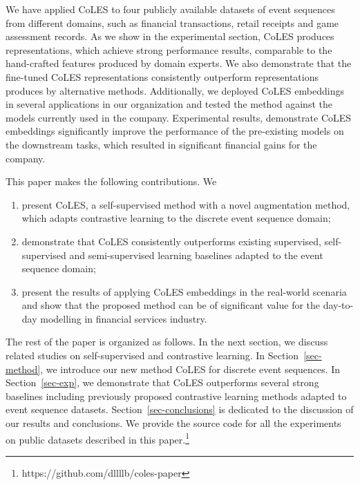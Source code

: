 \documentclass[sigconf]{acmart}
\begin{document}
We have applied CoLES to four publicly available datasets of event sequences from different
domains, such as financial transactions, retail receipts and game assessment records. As we
show in the experimental section, CoLES produces representations, which achieve strong
performance results, comparable to the hand-crafted features produced by domain experts.
We also demonstrate that the fine-tuned CoLES representations consistently outperform
representations produces by alternative methods.
%
%
Additionally, we deployed CoLES embeddings in several applications in our organization and tested
the method against the models currently used in the company. Experimental results, demonstrate
CoLES embeddings significantly improve the performance of the pre-existing models on the downstream
tasks, which resulted in significant financial gains for the company.

This paper makes the following contributions. We
\begin{enumerate}
    \item present CoLES, a self-supervised method with a novel augmentation method, which adapts
    contrastive learning to the discrete event sequence domain;

    \item demonstrate that CoLES consistently outperforms existing supervised, self-supervised and
    semi-supervised learning baselines adapted to the event sequence domain;

    \item present the results of applying CoLES embeddings in the real-world scenaria and show
    that the proposed method can be of significant value for the day-to-day modelling in financial
    services industry.
\end{enumerate}

The rest of the paper is organized as follows. In the next section, we discuss related studies
on self-supervised and contrastive learning. In Section~\ref{sec-method}, we introduce our new
method CoLES for discrete event sequences. In Section~\ref{sec-exp}, we demonstrate that CoLES
outperforms several strong baselines including previously proposed contrastive learning methods
adapted to event sequence datasets. Section~\ref{sec-conclusions} is dedicated to the discussion
of our results and conclusions.
% 
We provide the source code for all the experiments on public datasets described in this paper.\footnote{https://github.com/dllllb/coles-paper}
\end{document}
